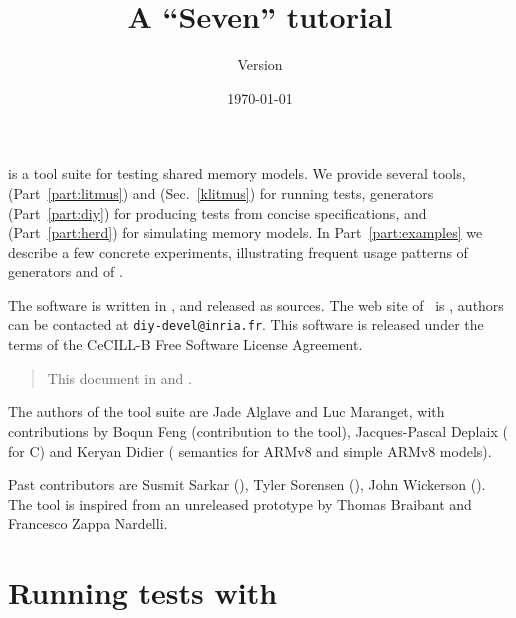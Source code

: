 \documentclass{article}
\title{A \prog{diy} ``Seven'' tutorial}
\author{Version \version}
\date{\today}
\begin{document}
\maketitle

\diy{} is a tool suite for testing shared memory models.  We
provide several tools, \litmus{} (Part~\ref{part:litmus})
and \klitmus{} (Sec.~\ref{klitmus}) for running tests,
\diy{} generators (Part~\ref{part:diy}) for producing tests from concise
specifications, and
\herd{} (Part~\ref{part:herd}) for simulating memory models.
In Part~\ref{part:examples} we describe
a few concrete experiments, illustrating frequent usage patterns of
\diy{} generators and of \litmus.


The software is written in
, and released as
sources.  The web site of~\diy{} is
, authors can be contacted at
\texttt{diy-devel@inria.fr}.
This software is released under the terms of the CeCILL-B Free Software License
Agreement.



\begin{htmlonly}
\begin{quote}
This document in  and .
\end{quote}
\end{htmlonly}

The authors of the \diy{} tool suite are Jade Alglave and Luc Maranget,
with contributions
by Boqun Feng (contribution to the  tool),
Jacques-Pascal Deplaix (\litmus{} for C) and
Keryan Didier (\herd{} semantics for ARMv8 and simple ARMv8 models).

Past contributors are Susmit Sarkar (),
Tyler Sorensen (), John Wickerson ().
The tool  is inspired from an unreleased prototype by
Thomas Braibant and Francesco Zappa Nardelli.

\tableofcontents
\cutend

\clearpage
\part{Running\label{part:litmus} tests with \litmus}

\end{document}
